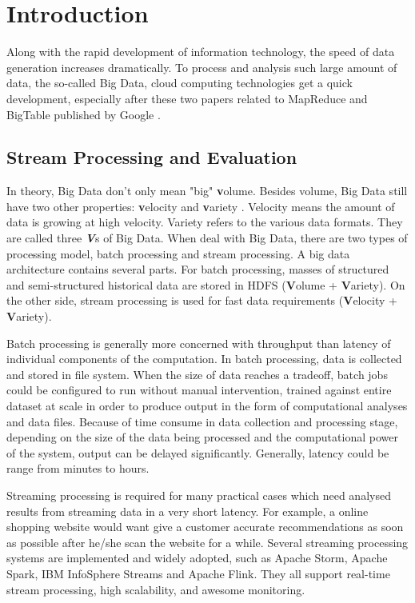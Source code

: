 \chapter{Introduction}
\label{chapter:intro}

Along with the rapid development of information technology, the speed of data generation increases dramatically. To process and analysis such large amount of data, the so-called Big Data,  cloud computing technologies get a quick development,  especially after these two papers related to MapReduce and BigTable published by Google  \cite{chang2006bigtable, dean2008mapreduce}.

\section{Stream Processing and Evaluation}
\label{section:big_data_analytics}
In theory, Big Data don't only mean "big" \textbf{v}olume. Besides volume, Big Data still have two other properties: \textbf{v}elocity and \textbf{v}ariety \cite{doug2001data}. Velocity means the amount of data is growing at high velocity. Variety refers to the various data formats.  They are called three \textbf{\textit{V}}s of Big Data.  When deal with Big Data, there are two types of processing model, batch processing and stream processing. A big data architecture contains several parts. For batch processing, masses of structured and semi-structured historical data are stored in HDFS (\textbf{V}olume + \textbf{V}ariety). On the other side, stream processing is used for fast data requirements (\textbf{V}elocity + \textbf{V}ariety)\cite{GameChanger}.

Batch processing is generally more concerned with throughput than latency of individual components of the computation. In batch processing, data is collected and stored in file system. When the size of data reaches a tradeoff, batch jobs could be configured to run without manual intervention, trained against entire dataset at scale in order to produce output in the form of computational analyses and data files. Because of time consume in data collection and processing stage, depending on the size of the data being processed and the computational power of the system, output can be delayed significantly. Generally, latency could be range from minutes to hours.

Streaming processing is required for many practical cases which need analysed results from streaming data in a very short latency. For example, a online shopping website would want give a customer accurate recommendations as soon as possible after he/she scan the website for a while.  Several streaming processing systems are implemented and widely adopted, such as Apache Storm, Apache Spark, IBM InfoSphere Streams and Apache Flink. They all support real-time stream processing, high scalability, and awesome monitoring. 

